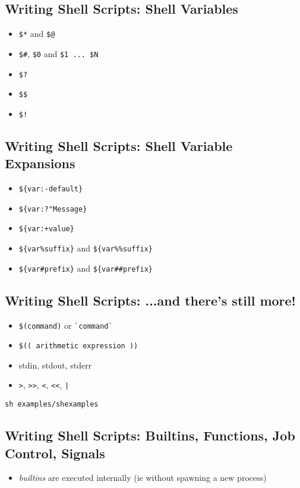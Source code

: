\documentclass[xga]{xdvislides}
\begin{document}
\subsection{Writing Shell Scripts: Shell Variables}
\begin{itemize}
	\item {\tt \$*} and {\tt \$@}
	\item {\tt \$\#}, {\tt \$0} and {\tt \$1 ... \$N}
	\item {\tt \$?}
	\item {\tt \$\$}
	\item {\tt \$!}
\end{itemize}

\subsection{Writing Shell Scripts: Shell Variable Expansions}
\begin{itemize}
	\item {\tt \$\{var:-default\}}
	\item {\tt \$\{var:?"Message\}}
	\item {\tt \$\{var:+value\}}
	\item {\tt \$\{var\%suffix\}} and {\tt \$\{var\%\%suffix\}}
	\item {\tt \$\{var\#prefix\}} and {\tt \$\{var\#\#prefix\}}
\end{itemize}

\subsection{Writing Shell Scripts: ...and there's still more!}
\begin{itemize}
	\item {\tt \$(command)} or {\tt \`{}command\`{}}
	\item {\tt \$(( arithmetic expression ))}
	\item stdin, stdout, stderr
	\item \verb+>+, \verb+>>+, \verb+<+, \verb+<<+, \verb+|+
\end{itemize}
\vspace{.5in}
{\tt sh examples/shexamples}

\subsection{Writing Shell Scripts: Builtins, Functions, Job Control, Signals}
\begin{itemize}
	\item {\em builtins} are executed internally (ie without spawning a
		new process)
\end{itemize}
\end{document}
